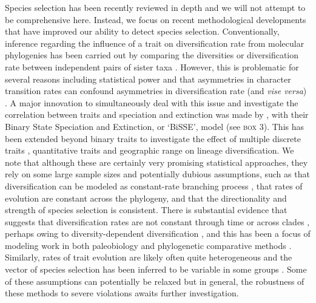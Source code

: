 Species selection has been recently reviewed in depth \citep{Jablonski2008, RaboskyMcCune2010} and we will not attempt to be comprehensive here. Instead, we focus on recent methodological developments that have improved our ability to detect species selection. Conventionally, inference regarding the influence of a trait on diversification rate from molecular phylogenies has been carried out by comparing the diversities or diversification rate between independent pairs of sister taxa \citep{Mitter1988, Sargent2004, Vamosi2004, RaboskyMcCune2010}. However, this is problematic for several reasons including statistical power \citep{Slowinski1989, Slowinski1993, VamosiVamosi} and that asymmetries in character transition rates can confound asymmetries in diversification rate (and \emph{vise versa}) \citep{Maddison2006}. A major innovation to simultaneously deal with this issue and investigate the correlation between traits and speciation and extinction was made by \citet{Maddison2007}, with their Binary State Speciation and Extinction, or `BiSSE', model (see \textsc{box 3}). This has been extended beyond binary traits to investigate the effect of multiple discrete traits \citep[`MuSSE';][]{FitzJohn2012}, quantitative traits \citep[`QuaSSE';][]{FitzJohn2010} and geographic range \citep[`GeoSSE';][]{Goldberg2011} on lineage diversification. We note that although these are certainly very promising statistical approaches, they rely on some large sample sizes and potentially dubious assumptions, such as that diversification can be modeled as constant-rate branching process \citep[i.e., a ``birth-death'' model;][]{Kendall1948}, that rates of evolution are constant across the phylogeny, and that the directionality and strength of species selection is consistent. There is substantial evidence that suggests that diversification rates are not constant through time or across clades \citep{Rabosky2007, McPeek2008, PhillimorePrice2008, Alfaro2009, Rabosky2012, Rabosky2013}, perhaps owing to diversity-dependent diversification \citep{Sepkoski1984, Alroy2008, Rabosky2009}, and this has been a focus of modeling work in both paleobiology \citep{Roy1996,  Eble2000, Sepkoski2000} and phylogenetic comparative methods \citep{Rabosky2008, Etienne2012, Etienne2012AmNat}. Similarly, rates of trait evolution are likely often quite heterogeneous \citep{Eastman2011, Beaulieu2013} and the vector of species selection has been inferred to be variable in some groups \citep{Jablonski1986, Simpson2010, Harnik2012}. Some of these assumptions can potentially be relaxed \citep{RaboskyGlor2010} but in general, the robustness of these methods to severe violations awaits further investigation.

